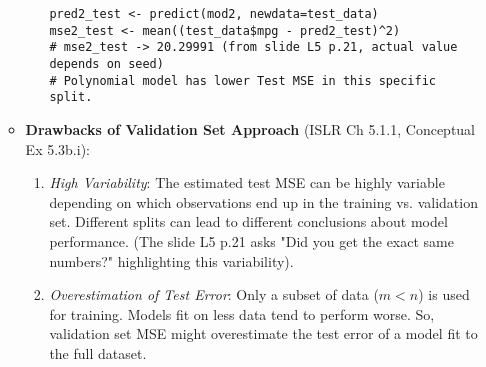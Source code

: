 \documentclass[12pt,a4paper]{article}
\begin{document}
\begin{itemize}
\begin{itemize}
\begin{itemize}
\begin{lstlisting}[caption={Validation Set Approach in R (Slides L5 p.16, 18, 21)}]
pred2_test <- predict(mod2, newdata=test_data)
mse2_test <- mean((test_data$mpg - pred2_test)^2)
# mse2_test -> 20.29991 (from slide L5 p.21, actual value depends on seed)
# Polynomial model has lower Test MSE in this specific split.
\end{lstlisting}
                \end{itemize}
            \item \textbf{Drawbacks of Validation Set Approach} (ISLR Ch 5.1.1, Conceptual Ex 5.3b.i):
                \begin{enumerate}
                    \item \textit{High Variability}: The estimated test MSE can be highly variable depending on which observations end up in the training vs. validation set. Different splits can lead to different conclusions about model performance. (The slide L5 p.21 asks "Did you get the exact same numbers?" highlighting this variability).
                    \item \textit{Overestimation of Test Error}: Only a subset of data ($m<n$) is used for training. Models fit on less data tend to perform worse. So, validation set MSE might overestimate the test error of a model fit to the full dataset.
                \end{enumerate}
        \end{itemize}


\end{itemize}
\end{document}
